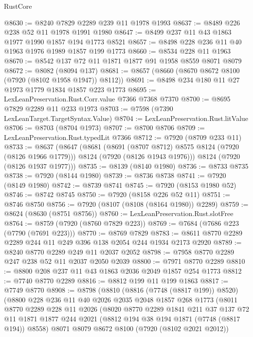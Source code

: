\begin{lexlean}{RustCore}
\begin{coremodule}
@8630 := @8240 @7829 @2289 @239 @11 @1978 @1993
@8637 := @8489 @226 @238 @52 @11 @1978 @1991 @1980
@8647 := @8499 @237 @11 @43 @1863 @1977 @1990 @1857 @194 @1773 @8521
@8657 := @8498 @228 @236 @11 @40 @1963 @1976 @1989 @1857 @199 @1773
@8660 := @8534 @228 @11 @1963
@8670 := @8542 @137 @72 @11 @1871 @1877 @91 @1958 @8559 @8071 @8079
@8672 := @8082 (@8094 @137)
@8681 := @8657 (@8660 (@8670 @8672 @8100 (@7920 (@8102 @1958 @1947)) @8112))
@8691 := @8498 @234 @180 @11 @27 @1973 @1779 @1834 @1857 @223 @1773
@8695 := LexLeanPreservation.Rust.Corr.value @7366 @7368 @7370
@8700 := @8695 @7829 @2289 @11 @233 @1973
@8703 := @7598 (@7390 LexLeanTarget.TargetSyntax.Value)
@8704 := LexLeanPreservation.Rust.litValue
@8706 := @8703 (@8704 @1973)
@8707 := @8700 @8706
@8709 := LexLeanPreservation.Rust.typedLit @7366
@8712 := @7920 (@8709 @233 @11)
@8733 := @8637
    (@8647
      (@8681
        (@8691 (@8707 @8712) @8575 @8124 (@7920 (@8126 @1966 @1779)))
        @8124
        (@7920 (@8126 @1943 @1976)))
      @8124
      (@7920 (@8126 @1937 @1977)))
@8735 := @8139 (@8140 @1980)
@8736 := @8733 @8735
@8738 := @7920 (@8144 @1980)
@8739 := @8736 @8738
@8741 := @7920 (@8149 @1980)
@8742 := @8739 @8741
@8745 := @7920 (@8153 @1980 @52)
@8746 := @8742 @8745
@8750 := @7920 (@8158 @226 @52 @11)
@8751 := @8746 @8750
@8756 := @7920 (@8107 (@8108 (@8164 @1980)) @2289)
@8759 := @8624 (@8630 (@8751 @8756))
@8760 := LexLeanPreservation.Rust.slotFree
@8764 := @8759 (@7920 (@8760 @7829 @223))
@8769 := @7684 (@7686 @223 (@7790 (@7691 @223)))
@8770 := @8769 @7829
@8783 := @8611 @8770 @2289 @2289 @244 @11 @249 @396 @138 @2054 @244 @1934 @2173 @2920
@8789 := @8240 @8770 @2289 @249 @11 @2037 @2052
@8798 := @7958 @8770 @2289 @247 @238 @52 @11 @2037 @2050 @2039
@8800 := @7971 @8770 @2289
@8810 := @8800 @208 @237 @11 @43 @1863 @2036 @2049 @1857 @254 @1773
@8812 := @7740 @8770 @2289
@8816 := @8812 @199 @11 @199 @1863
@8817 := @7749 @8770
@8908 := @8798
    (@8810
      (@8816 (@7748 (@8817 @199)) @8520)
      (@8800
        @228
        @236
        @11
        @40
        @2026
        @2035
        @2048
        @1857
        @268
        @1773
        (@8011
          @8770
          @2289
          @228
          @11
          @2026
          (@8020
            @8770
            @2289
            @1841
            @211
            @37
            @137
            @72
            @11
            @1871
            @1877
            @244
            @2021
            (@8812 @194 @38 @194 @1871 (@7748 (@8817 @194)) @8558)
            @8071
            @8079
            @8672
            @8100
            (@7920 (@8102 @2021 @2012))

\end{coremodule}
\end{lexlean}
